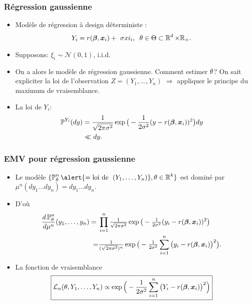 \begin{frame}
\frametitle{Régression gaussienne}


\begin{itemize}
\item  Modèle de régression à design déterministe :
$$Y_i =
r({\boldsymbol{\beta}},\operatorname{\boldsymbol{x}}_i)+\ \sigma xi_i,\;\;\theta \in \Theta\subset  \operatorname{{\mathbb R}}^d \times \mathbb{R}_+.$$
\item  Supposons: $\xi_i \sim {\mathcal N}(0,1)$, i.i.d.
\item On a alors le modèle de \alert{régression gaussienne}.
Comment estimer $\theta$?  \alert{On sait expliciter la loi
de l'observation} $Z=(Y_1,\dots,Y_n)$ $\Longrightarrow$ appliquer le
principe du maximum de vraisemblance.

\item La loi de $Y_i$:
\begin{align*}
\operatorname{{\mathbb P}}^{Y_i}(dy) & = \frac{1}{\sqrt{2\pi \sigma^2}}\exp\big
(-\frac{1}{2\sigma^2}(y-r({\boldsymbol{\beta}},\operatorname{\boldsymbol{x}}_i))^2\big)dy \\
& \ll dy.
\end{align*}

\end{itemize}
\end{frame}

\begin{frame}
\frametitle{EMV pour régression gaussienne}
\begin{itemize}
\item  Le modèle $\{\PP_\truetheta^n \alert{ = \text{loi de }\;(Y_1,\ldots, Y_n)},\truetheta \in \R^k\}$ est \alert{dominé} par
$\mu^n(dy_1\ldots dy_n) = dy_1\ldots dy_n.$
\item D'où
\begin{align*}
 \frac{d\operatorname{{\mathbb P}}_\theta^n}{d\mu^n}(y_1,\ldots, y_n)
  =\; &\prod_{i=1}^n \tfrac{1}{\sqrt{2\pi \sigma^2}}\exp
  \big(-\tfrac{1}{2\sigma^2}(y_i-r({\boldsymbol{\beta}},\operatorname{\boldsymbol{x}}_i))^2\big) \\
\;= & \tfrac{1}{(\sqrt{2\pi \sigma^2})^{n}}
\exp\big(-\tfrac{1}{2\sigma^2}\sum_{i =
1}^n\big(y_i-r({\boldsymbol{\beta}},\operatorname{\boldsymbol{x}}_i)\big)^2\big).
\end{align*}
\item La fonction de vraisemblance
$$\boxed{{\mathcal L}_n(\theta, Y_1,\ldots, Y_n)
\propto \exp\Big(-\frac{1}{2\sigma^2}\sum_{i = 1}^n\big(Y_i-
r({\boldsymbol{\beta}},\operatorname{\boldsymbol{x}}_i)\big)^2\Big)}$$
\end{itemize}
\end{frame}

